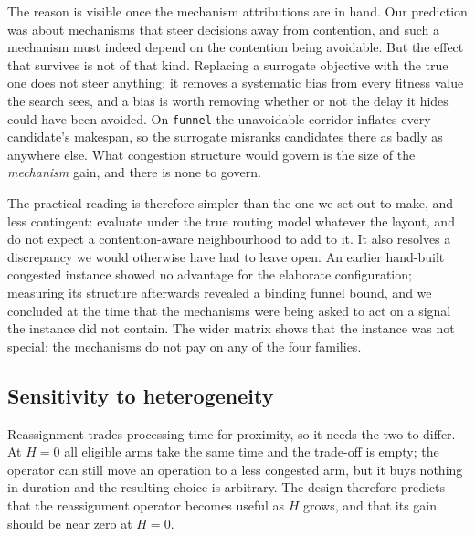 \documentclass[manuscript,screen,review]{acmart}
\begin{document}
\begin{table}[t]
\caption{Gain of the proposed method over two-stage in every cell, by congestion
family and heterogeneity, and pooled per family ($n=40$ seed-paired comparisons
per family). Positive favours the proposed method.}
\label{tab:bytag}
\small

\end{table}

The reason is visible once the mechanism attributions are in hand. Our
prediction was about mechanisms that steer decisions away from contention, and
such a mechanism must indeed depend on the contention being avoidable. But the
effect that survives is not of that kind. Replacing a surrogate objective with
the true one does not steer anything; it removes a systematic bias from every
fitness value the search sees, and a bias is worth removing whether or not the
delay it hides could have been avoided. On \texttt{funnel} the unavoidable
corridor inflates every candidate's makespan, so the surrogate misranks
candidates there as badly as anywhere else. What congestion structure would
govern is the size of the \emph{mechanism} gain, and there is none to govern.

The practical reading is therefore simpler than the one we set out to make, and
less contingent: evaluate under the true routing model whatever the layout, and
do not expect a contention-aware neighbourhood to add to it. It also resolves a
discrepancy we would otherwise have had to leave open. An earlier hand-built
congested instance showed no advantage for the elaborate configuration;
measuring its structure afterwards revealed a binding funnel bound, and we
concluded at the time that the mechanisms were being asked to act on a signal
the instance did not contain. The wider matrix shows that the instance was not
special: the mechanisms do not pay on any of the four families.

\subsection{Sensitivity to heterogeneity}
\label{sec:hetero}

Reassignment trades processing time for proximity, so it needs the two to
differ. At $H=0$ all eligible arms take the same time and the trade-off is
empty; the operator can still move an operation to a less congested arm, but it
buys nothing in duration and the resulting choice is arbitrary. The design
therefore predicts that the reassignment operator becomes useful as $H$ grows,
and that its gain should be near zero at $H=0$.
\end{document}
